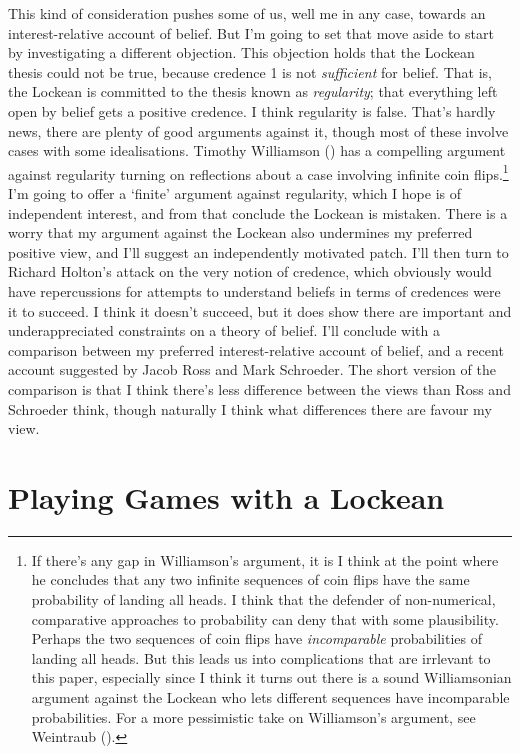 \documentclass[
  10pt,
  letterpaper,
  DIV=11,
  numbers=noendperiod,
  twoside]{scrartcl}
\begin{document}
This kind of consideration pushes some of us, well me in any case,
towards an interest-relative account of belief. But I'm going to set
that move aside to start by investigating a different objection. This
objection holds that the Lockean thesis could not be true, because
credence 1 is not \emph{sufficient} for belief. That is, the Lockean is
committed to the thesis known as \emph{regularity}; that everything left
open by belief gets a positive credence. I think regularity is false.
That's hardly news, there are plenty of good arguments against it,
though most of these involve cases with some idealisations. Timothy
Williamson () has a
compelling argument against regularity turning on reflections about a
case involving infinite coin flips.\footnote{If there's any gap in
  Williamson's argument, it is I think at the point where he concludes
  that any two infinite sequences of coin flips have the same
  probability of landing all heads. I think that the defender of
  non-numerical, comparative approaches to probability can deny that
  with some plausibility. Perhaps the two sequences of coin flips have
  \emph{incomparable} probabilities of landing all heads. But this leads
  us into complications that are irrlevant to this paper, especially
  since I think it turns out there is a sound Williamsonian argument
  against the Lockean who lets different sequences have incomparable
  probabilities. For a more pessimistic take on Williamson's argument,
  see Weintraub ().} I'm going to
offer a `finite' argument against regularity, which I hope is of
independent interest, and from that conclude the Lockean is mistaken.
There is a worry that my argument against the Lockean also undermines my
preferred positive view, and I'll suggest an independently motivated
patch. I'll then turn to Richard Holton's attack on the very notion of
credence, which obviously would have repercussions for attempts to
understand beliefs in terms of credences were it to succeed. I think it
doesn't succeed, but it does show there are important and
underappreciated constraints on a theory of belief. I'll conclude with a
comparison between my preferred interest-relative account of belief, and
a recent account suggested by Jacob Ross and Mark Schroeder. The short
version of the comparison is that I think there's less difference
between the views than Ross and Schroeder think, though naturally I
think what differences there are favour my view.

\section{Playing Games with a
Lockean}\label{playing-games-with-a-lockean}
\end{document}

